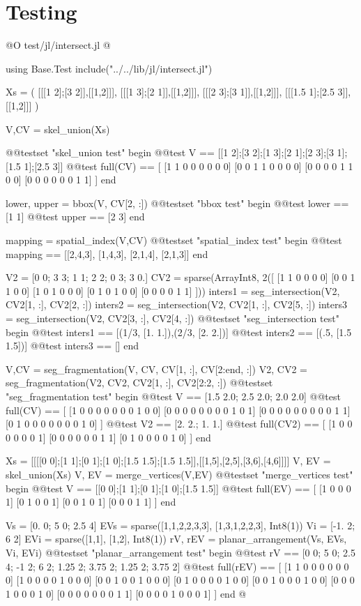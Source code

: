 \documentclass[10pt,oneside]{article}
\begin{document}
\section{Testing}
@O test/jl/intersect.jl
@{using Base.Test
include("../../lib/jl/intersect.jl")

Xs = (
    [[[1 2];[3 2]],[[1,2]]],
    [[[1 3];[2 1]],[[1,2]]],
    [[[2 3];[3 1]],[[1,2]]],
    [[[1.5 1];[2.5 3]],[[1,2]]]
)

V,CV = skel_union(Xs)

@@testset "skel_union test" begin
    @@test V == [[1 2];[3 2];[1 3];[2 1];[2 3];[3 1];[1.5 1];[2.5 3]]
    @@test full(CV) == [
        [1 1 0 0 0 0 0 0]
        [0 0 1 1 0 0 0 0]
        [0 0 0 0 1 1 0 0]
        [0 0 0 0 0 0 1 1]
    ]
end

lower, upper = bbox(V, CV[2, :])
@@testset "bbox test" begin
    @@test lower == [1 1]
    @@test upper == [2 3]
end

mapping = spatial_index(V,CV)
@@testset "spatial_index test" begin
    @@test mapping == [[2,4,3], [1,4,3], [2,1,4], [2,1,3]]
end

V2 = [0 0; 3 3; 1 1; 2 2; 0 3; 3 0.]
CV2 = sparse(Array{Int8, 2}([
    [1 1 0 0 0 0]
    [0 0 1 1 0 0]
    [1 0 1 0 0 0]
    [0 1 0 1 0 0]
    [0 0 0 0 1 1]
]))
inters1 = seg_intersection(V2, CV2[1, :], CV2[2, :])
inters2 = seg_intersection(V2, CV2[1, :], CV2[5, :])
inters3 = seg_intersection(V2, CV2[3, :], CV2[4, :])
@@testset "seg_intersection test" begin
    @@test inters1 == [(1/3, [1. 1.]),(2/3, [2. 2.])]
    @@test inters2 == [(.5, [1.5 1.5])]
    @@test inters3 == []
end

V,CV = seg_fragmentation(V, CV, CV[1, :], CV[2:end, :])
V2, CV2 = seg_fragmentation(V2, CV2, CV2[1, :], CV2[2:2, :])
@@testset "seg_fragmentation test" begin
    @@test V == [1.5 2.0; 2.5 2.0; 2.0 2.0]
    @@test full(CV) == [
        [1 0 0 0 0 0 0 0 1 0 0]
        [0 0 0 0 0 0 0 0 1 0 1]
        [0 0 0 0 0 0 0 0 0 1 1]
        [0 1 0 0 0 0 0 0 0 1 0]
    ]
    @@test V2 == [2. 2.; 1. 1.]
    @@test full(CV2) == [
        [1 0 0 0 0 0 0 1]
        [0 0 0 0 0 0 1 1]
        [0 1 0 0 0 0 1 0]
    ] 
end

Xs = [[[[0 0];[1 1];[0 1];[1 0];[1.5 1.5];[1.5 1.5]],[[1,5],[2,5],[3,6],[4,6]]]]
V, EV = skel_union(Xs)
V, EV = merge_vertices(V,EV)
@@testset "merge_vertices test" begin
    @@test V == [[0 0];[1 1];[0 1];[1 0];[1.5 1.5]]
    @@test full(EV) == [
        [1 0 0 0 1]
        [0 1 0 0 1]
        [0 0 1 0 1]
        [0 0 0 1 1]
    ]
end

Vs = [0. 0; 5 0; 2.5 4]
EVs = sparse([1,1,2,2,3,3], [1,3,1,2,2,3], Int8(1))
Vi = [-1. 2; 6 2]
EVi = sparse([1,1], [1,2], Int8(1))
rV, rEV = planar_arrangement(Vs, EVs, Vi, EVi)
@@testset "planar_arrangement test" begin
    @@test rV == [0 0; 5 0; 2.5 4; -1 2; 6 2; 1.25 2; 3.75 2; 1.25 2; 3.75 2]
    @@test full(rEV) == [
        [1 1 0 0 0 0 0 0 0]
        [1 0 0 0 0 1 0 0 0]
        [0 0 1 0 0 1 0 0 0]
        [0 1 0 0 0 0 1 0 0]
        [0 0 1 0 0 0 1 0 0]
        [0 0 0 1 0 0 0 1 0]
        [0 0 0 0 0 0 0 1 1]
        [0 0 0 0 1 0 0 0 1]
    ]
end
@}
\end{document}
